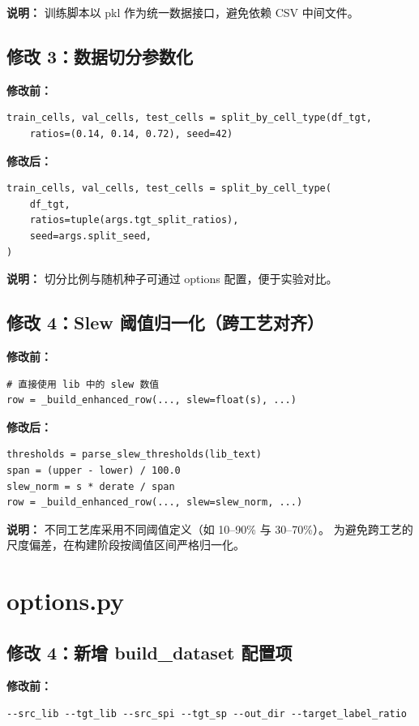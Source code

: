 \documentclass[11pt]{article}
\begin{document}
\textbf{说明：} 训练脚本以 pkl 作为统一数据接口，避免依赖 CSV 中间文件。

\subsection*{修改 3：数据切分参数化}
\textbf{修改前：}
\begin{lstlisting}
train_cells, val_cells, test_cells = split_by_cell_type(df_tgt,
    ratios=(0.14, 0.14, 0.72), seed=42)
\end{lstlisting}

\textbf{修改后：}
\begin{lstlisting}
train_cells, val_cells, test_cells = split_by_cell_type(
    df_tgt,
    ratios=tuple(args.tgt_split_ratios),
    seed=args.split_seed,
)
\end{lstlisting}

\textbf{说明：} 切分比例与随机种子可通过 options 配置，便于实验对比。

\subsection*{修改 4：Slew 阈值归一化（跨工艺对齐）}
\textbf{修改前：}
\begin{lstlisting}
# 直接使用 lib 中的 slew 数值
row = _build_enhanced_row(..., slew=float(s), ...)
\end{lstlisting}

\textbf{修改后：}
\begin{lstlisting}
thresholds = parse_slew_thresholds(lib_text)
span = (upper - lower) / 100.0
slew_norm = s * derate / span
row = _build_enhanced_row(..., slew=slew_norm, ...)
\end{lstlisting}

\textbf{说明：} 不同工艺库采用不同阈值定义（如 10--90\% 与 30--70\%）。
为避免跨工艺的尺度偏差，在构建阶段按阈值区间严格归一化。

\section{options.py}
\subsection*{修改 4：新增 build\_dataset 配置项}
\textbf{修改前：}
\begin{lstlisting}
--src_lib --tgt_lib --src_spi --tgt_sp --out_dir --target_label_ratio
\end{lstlisting}
\end{document}
